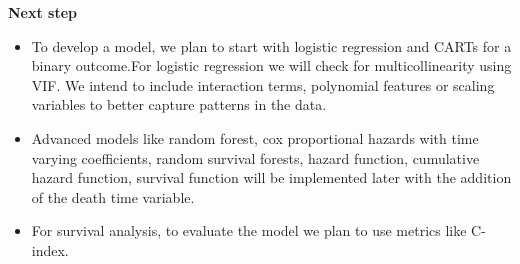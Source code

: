 \documentclass[
]{article}
\begin{document}
\textbf{Next step}

\begin{itemize}
\item
  To develop a model, we plan to start with logistic regression and
  CARTs for a binary outcome.For logistic regression we will check for
  multicollinearity using VIF. We intend to include interaction terms,
  polynomial features or scaling variables to better capture patterns in
  the data.
\item
  Advanced models like random forest, cox proportional hazards with time
  varying coefficients, random survival forests, hazard function,
  cumulative hazard function, survival function will be implemented
  later with the addition of the death time variable.
\item
  For survival analysis, to evaluate the model we plan to use metrics
  like C-index.
\end{itemize}
\end{document}
